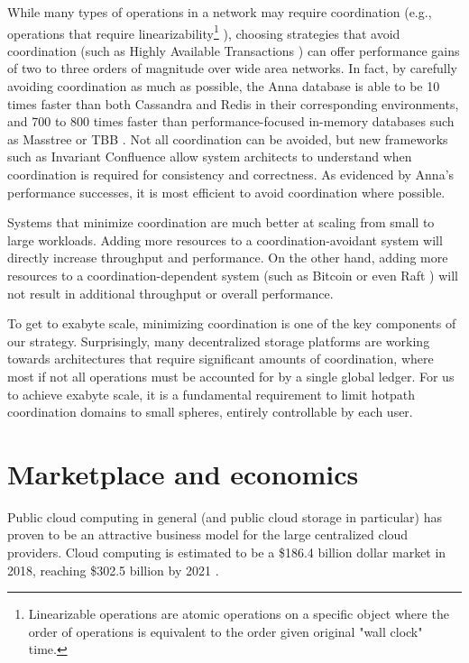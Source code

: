 \documentclass[11pt,fleqn,openany]{book}
\begin{document}
While many types of operations in a network may require coordination
(e.g., operations that require linearizability\footnote{
Linearizable operations are atomic operations on a specific object where
the order of operations is equivalent to the order given original "wall clock"
time.
}
\cite{jepsen-consistency, hat, vv-consistency}), choosing strategies that
avoid coordination (such as Highly Available Transactions \cite{hat}) can offer
performance gains of two to three orders of magnitude over wide area networks.
In fact, by carefully avoiding coordination as much as possible, the Anna
database is able to be 10 times faster than both Cassandra and Redis in their
corresponding environments, and 700 to 800 times faster than
performance-focused in-memory databases such as Masstree or TBB
\cite{anna, anna-announce}.
Not all coordination can be avoided, but new frameworks such as Invariant
Confluence \cite{i-confluence} allow system architects to understand when
coordination is required for consistency and correctness. As evidenced
by Anna's performance successes, it is most efficient to avoid coordination
where possible.

Systems that minimize coordination are
much better at scaling from small
to large workloads. Adding more resources to a coordination-avoidant system
will directly increase throughput and performance. On the other hand,
adding more resources to a coordination-dependent system
(such as Bitcoin \cite{bitcoin} or even Raft \cite{raft}) will not result in
additional throughput or overall performance.

To get to exabyte scale, minimizing coordination is one of the key components
of our strategy.
Surprisingly, many decentralized storage platforms are working towards
architectures that require significant amounts of coordination,
where most if not all operations must be accounted for by a single global
ledger. For us to achieve exabyte scale, it is a fundamental
requirement to limit hotpath coordination domains to small spheres,
entirely controllable by each user.

\section{Marketplace and economics}

Public cloud computing in general (and public cloud storage in particular) has
proven to be an attractive business model for the large centralized cloud
providers. Cloud computing is estimated to be a \$186.4 billion dollar market
in 2018, reaching \$302.5 billion by 2021 \cite{gartner-cloud-growth}.
\end{document}
